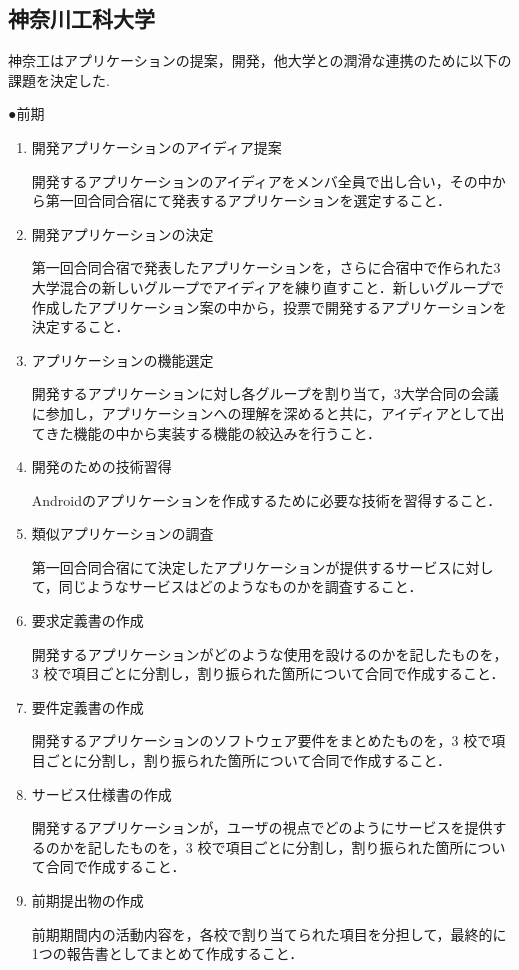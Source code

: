 \subsection{神奈川工科大学}
神奈工はアプリケーションの提案，開発，他大学との潤滑な連携のために以下の課題を決定した.
\par●前期
\begin{enumerate}
\item 開発アプリケーションのアイディア提案
\par 開発するアプリケーションのアイディアをメンバ全員で出し合い，その中から第一回合同合宿にて発表するアプリケーションを選定すること．
\item 開発アプリケーションの決定
\par 第一回合同合宿で発表したアプリケーションを，さらに合宿中で作られた3大学混合の新しいグループでアイディアを練り直すこと．新しいグループで作成したアプリケーション案の中から，投票で開発するアプリケーションを決定すること．
\item アプリケーションの機能選定
\par 開発するアプリケーションに対し各グループを割り当て，3大学合同の会議に参加し，アプリケーションへの理解を深めると共に，アイディアとして出てきた機能の中から実装する機能の絞込みを行うこと．
\item 開発のための技術習得
\par Androidのアプリケーションを作成するために必要な技術を習得すること．
\item 類似アプリケーションの調査
\par 第一回合同合宿にて決定したアプリケーションが提供するサービスに対して，同じようなサービスはどのようなものかを調査すること．
\item 要求定義書の作成
\par 開発するアプリケーションがどのような使用を設けるのかを記したものを，3 校で項目ごとに分割し，割り振られた箇所について合同で作成すること．
\item 要件定義書の作成
\par 開発するアプリケーションのソフトウェア要件をまとめたものを，3 校で項目ごとに分割し，割り振られた箇所について合同で作成すること．
\item サービス仕様書の作成
\par 開発するアプリケーションが，ユーザの視点でどのようにサービスを提供するのかを記したものを，3 校で項目ごとに分割し，割り振られた箇所について合同で作成すること．
\item 前期提出物の作成
\par 前期期間内の活動内容を，各校で割り当てられた項目を分担して，最終的に1つの報告書としてまとめて作成すること．
\end{enumerate}

